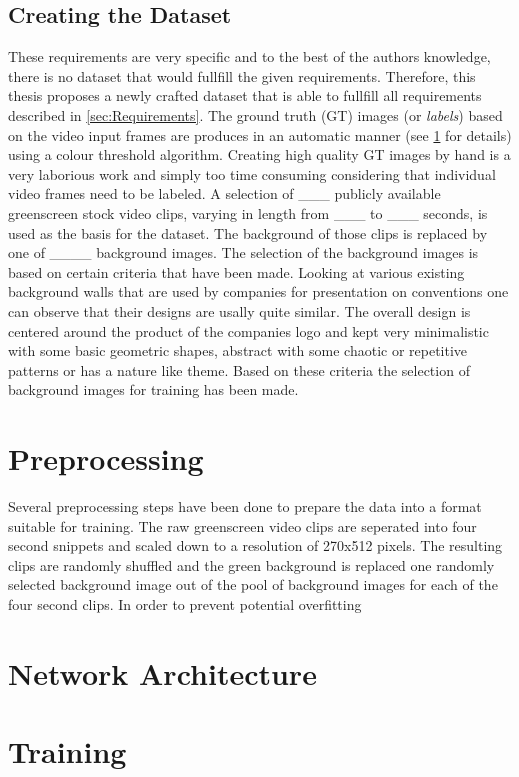 \documentclass[11pt,
  paper=a4, 
  bibliography=totocnumbered,
	captions=tableheading,
	BCOR=10mm
]{scrreprt}
\theoremstyle{definition}
\begin{document}
\subsection{Creating the Dataset}
These requirements are very specific and to the best of the authors knowledge, there is no dataset that would fullfill the given requirements.
Therefore, this thesis proposes a newly crafted dataset that is able to fullfill all requirements described in \ref{sec:Requirements}.
The ground truth (GT) images (or \textit{labels}) based on the video input frames are produces in an automatic manner (see \ref{sec:Preprocessing} for details) using a colour threshold algorithm.
Creating high quality GT images by hand is a very laborious work and simply too time consuming considering that individual video frames need to be labeled.
A selection of ___  publicly available greenscreen stock video clips, varying in length from ___ to ___ seconds, is used as the basis for the dataset.
The background of those clips is replaced by one of ____ background images.
The selection of the background images is based on certain criteria that have been made.
Looking at various existing background walls that are used by companies for presentation on conventions one can observe that their designs are usally quite similar.
The overall design is centered around the product of the companies logo and kept very minimalistic with some basic geometric shapes, abstract with some chaotic or repetitive patterns or has a nature like theme.
Based on these criteria the selection of background images for training has been made.

\section{Preprocessing}\label{sec:Preprocessing}
Several preprocessing steps have been done to prepare the data into a format suitable for training.
The raw greenscreen video clips are seperated into four second snippets and scaled down to a resolution of 270x512 pixels.
The resulting clips are randomly shuffled and the green background is replaced one randomly selected background image out of the pool of background images for each of the four second clips.
In order to prevent potential overfitting


\section{Network Architecture}
\section{Training}
\end{document}
